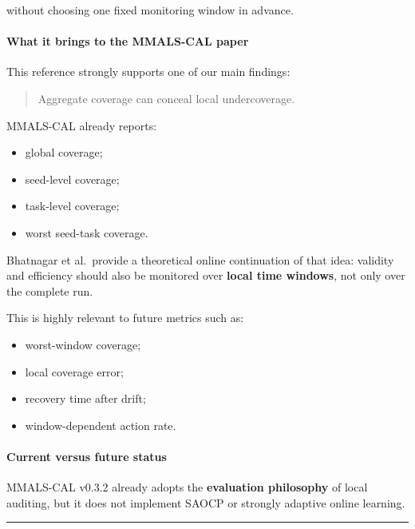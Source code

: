 without choosing one fixed monitoring window in advance.

\paragraph{What it brings to the MMALS-CAL paper}\label{what-it-brings-to-the-mmals-cal-paper-5}

This reference strongly supports one of our main findings:

\begin{quote}
Aggregate coverage can conceal local undercoverage.
\end{quote}

MMALS-CAL already reports:

\begin{itemize}
\tightlist
\item
  global coverage;
\item
  seed-level coverage;
\item
  task-level coverage;
\item
  worst seed-task coverage.
\end{itemize}

Bhatnagar et al.~provide a theoretical online continuation of that idea: validity and efficiency should also be monitored over \textbf{local time windows}, not only over the complete run.

This is highly relevant to future metrics such as:

\begin{itemize}
\tightlist
\item
  worst-window coverage;
\item
  local coverage error;
\item
  recovery time after drift;
\item
  window-dependent action rate.
\end{itemize}

\paragraph{Current versus future status}\label{current-versus-future-status}

MMALS-CAL v0.3.2 already adopts the \textbf{evaluation philosophy} of local auditing, but it does not implement SAOCP or strongly adaptive online learning.

\begin{center}\rule{0.5\linewidth}{0.5pt}\end{center}

